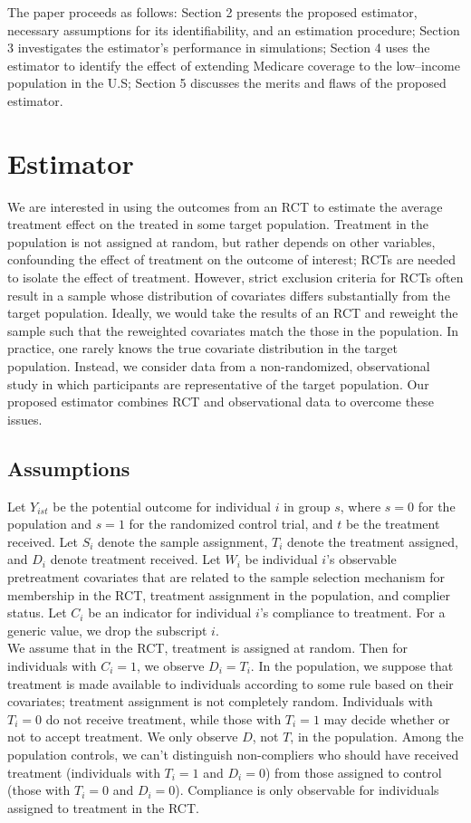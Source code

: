 \documentclass[12pt]{article}
\begin{document}
The paper proceeds as follows: Section 2 presents the proposed estimator, necessary assumptions for its identifiability, and an estimation procedure; Section 3 investigates the estimator's performance in simulations; Section 4 uses the estimator to identify the effect of extending Medicare coverage to the low--income population in the U.S; Section 5 discusses the merits and flaws of the proposed estimator.

\section{Estimator} \label{estimator}
We are interested in using the outcomes from an RCT to estimate the average treatment effect on the treated in some target population.  Treatment in the population is not assigned at random, but rather depends on other variables, confounding the effect of treatment on the outcome of interest; RCTs are needed to isolate the effect of treatment. However, strict exclusion criteria for RCTs often result in a sample whose distribution of covariates differs substantially from the target population.  Ideally, we would take the results of an RCT and reweight the sample such that the reweighted covariates match the those in the population. In practice, one rarely knows the true covariate distribution in the target population.  Instead, we consider data from a non-randomized, observational study in which participants are representative of the target population.  Our proposed estimator combines RCT and observational data to overcome these issues.

\subsection{Assumptions} 
Let $Y_{ist}$ be the potential outcome for individual $i$ in group $s$, where $s=0$ for the population and $s=1$ for the randomized control trial, and $t$ be the treatment received.  Let $S_i$ denote the sample assignment, $T_i$ denote the treatment assigned, and $D_i$ denote treatment received. Let $W_i$ be individual $i$'s observable pretreatment covariates that are related to the sample selection mechanism for membership in the RCT, treatment assignment in the population, and complier status.  Let $C_i$ be an indicator for individual $i$'s compliance to treatment.  For a generic value, we drop the subscript $i$.  \\

We assume that in the RCT, treatment is assigned at random.  Then for individuals with $C_i = 1$, we observe $D_i = T_i$.  In the population, we suppose that treatment is made available to individuals according to some rule based on their covariates; treatment assignment is not completely random. Individuals with $T_i = 0$ do not receive treatment, while those with $T_i=1$ may decide whether or not to accept treatment.  We only observe $D$, not $T$, in the population.  Among the population controls, we can't distinguish non-compliers who should have received treatment (individuals with $T_i=1$ and $D_i = 0$) from those assigned to control (those with $T_i = 0$ and $D_i = 0$).  Compliance is only observable for individuals assigned to treatment in the RCT. \\
\end{document}

